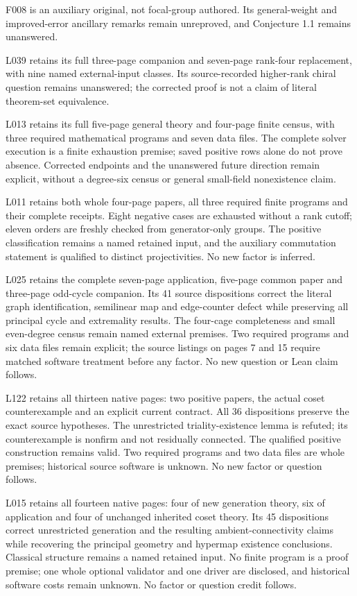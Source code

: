 \documentclass[11pt,a4paper]{article}
\begin{document}
F008 is an auxiliary original, not focal-group authored. Its general-weight and
improved-error ancillary remarks remain unreproved, and Conjecture 1.1 remains
unanswered.

L039 retains its full three-page companion and seven-page rank-four replacement,
with nine named external-input classes. Its source-recorded higher-rank chiral
question remains unanswered; the corrected proof is not a claim of literal
theorem-set equivalence.

L013 retains its full five-page general theory and four-page finite census,
with three required mathematical programs and seven data files. The complete
solver execution is a finite exhaustion premise; saved positive rows alone do
not prove absence. Corrected endpoints and the unanswered future direction
remain explicit, without a degree-six census or general small-field nonexistence
claim.

L011 retains both whole four-page papers, all three required finite programs
and their complete receipts. Eight negative cases are exhausted without a rank
cutoff; eleven orders are freshly checked from generator-only groups. The positive
classification remains a named retained input, and the auxiliary commutation
statement is qualified to distinct projectivities. No new factor is inferred.

L025 retains the complete seven-page application, five-page common paper and
three-page odd-cycle companion. Its 41 source dispositions correct the literal
graph identification, semilinear map and edge-counter defect while preserving
all principal cycle and extremality results. The four-cage completeness and
small even-degree census remain named external premises. Two required programs
and six data files remain explicit; the source listings on pages 7 and 15 require
matched software treatment before any factor. No new question or Lean claim follows.

L122 retains all thirteen native pages: two positive papers, the actual coset
counterexample and an explicit current contract. All 36 dispositions preserve
the exact source hypotheses. The unrestricted triality-existence lemma is refuted;
its counterexample is nonfirm and not residually connected. The qualified positive
construction remains valid. Two required programs and two data files are whole
premises; historical source software is unknown. No new factor or question follows.

L015 retains all fourteen native pages: four of new generation theory, six of
application and four of unchanged inherited coset theory. Its 45 dispositions
correct unrestricted generation and the resulting ambient-connectivity claims
while recovering the principal geometry and hypermap existence conclusions.
Classical structure remains a named retained input. No finite program is a
proof premise; one whole optional validator and one driver are disclosed, and
historical software costs remain unknown. No factor or question credit follows.
\end{document}
